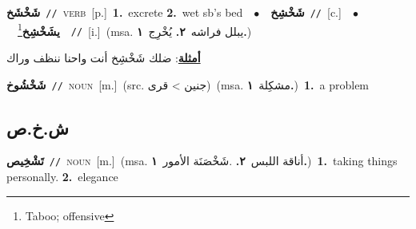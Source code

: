 \documentclass[10pt,a4paper,twoside]{article} %
\begin{document}
\begin{multicols}{2}
{\setlength\topsep{0pt}\textbf{\foreignlanguage{arabic}{شَخْشَخ}}\ {\color{gray}\texttt{//}\color{black}}\ \textsc{verb}\ [p.]\ \textbf{1.}~excrete  \textbf{2.}~wet sb's bed\ \ $\bullet$\ \ \setlength\topsep{0pt}\textbf{\foreignlanguage{arabic}{شَخْشِخ}}\ {\color{gray}\texttt{//}\color{black}}\ [c.]\ \ $\bullet$\ \ \setlength\topsep{0pt}\textbf{\foreignlanguage{arabic}{يشَخْشِخ}}\footnote{Taboo; offensive}\ \ {\color{gray}\texttt{//}\color{black}}\ [i.]\ \color{gray}(msa. \foreignlanguage{arabic}{يبلل فراشه}~\foreignlanguage{arabic}{\textbf{٢.}}  \foreignlanguage{arabic}{يُخْرِج}~\foreignlanguage{arabic}{\textbf{١.}})\color{black}\  \begin{flushright}\color{gray}\foreignlanguage{arabic}{\textbf{\underline{\foreignlanguage{arabic}{أمثلة}}}: ضلك شَخْشِخ أنت واحنا ننظف وراك}\end{flushright}\color{black}} \vspace{2mm}

{\setlength\topsep{0pt}\textbf{\foreignlanguage{arabic}{شَخْشُوخ}}\ {\color{gray}\texttt{//}\color{black}}\ \textsc{noun}\ [m.]\ (src. \color{gray}\foreignlanguage{arabic}{جنين > قرى}\color{black})\ \color{gray}(msa. \foreignlanguage{arabic}{مشكِلة}~\foreignlanguage{arabic}{\textbf{١.}})\color{black}\ \textbf{1.}~a problem\ } \vspace{2mm}

\vspace{-3mm}
\subsection*{\color{blue}\foreignlanguage{arabic}{ش.خ.ص}\color{blue}{}} 

{\setlength\topsep{0pt}\textbf{\foreignlanguage{arabic}{تَشْخِيص}}\ {\color{gray}\texttt{//}\color{black}}\ \textsc{noun}\ [m.]\ \color{gray}(msa. \foreignlanguage{arabic}{أناقة اللبس}~\foreignlanguage{arabic}{\textbf{٢.}}  .\foreignlanguage{arabic}{شَخْصَنَة الأمور}~\foreignlanguage{arabic}{\textbf{١.}})\color{black}\ \textbf{1.}~taking things personally.  \textbf{2.}~elegance\ } \vspace{2mm}


\end{multicols}
\end{document}
